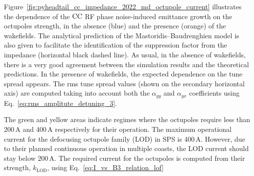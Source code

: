 Figure~\ref{fig:pyheadtail_cc_impedance_2022_md_octupole_current} illustrates the dependence of the ${\mathrm{CC}}$ RF phase noise-induced emittance growth on the octupoles strength, in the absence (blue) and the presence (orange) of the wakefields. The analytical prediction of the Mastoridis--Baudrenghien model is also given to facilitate the identification of the suppression factor from the impedance (horizontal black dashed line). As usual, in the absence of wakefields, there is a very good agreement between the simulation results and the theoretical predictions. In the presence of wakefields, the expected dependence on the tune spread appears. The rms tune spread values (shown on the secondary horizontal axis) are computed taking into account both the $\alpha_{{yy}}$ and $\alpha_{{yx}}$ coefficients using Eq.~\eqref{eq:rms_amplitute_detuning_3}.

The green and yellow areas indicate regimes where the octupoles require less than 200\,A and 400\,A respectively for their operation. The maximum operational current for the defocusing octupole family (LOD) in SPS is 400\,A. However, due to their planned continuous operation in multiple coasts, the LOD current should stay below 200\,A. The required current for the octupoles is computed from their strength, $k_\mathrm{LOD}$, using Eq.~\eqref{eq:I_vs_B3_relation_lof}

